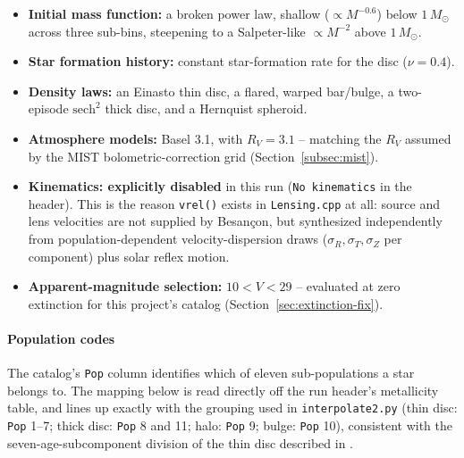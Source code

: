 \documentclass[english,10pt,a4paper]{article}
\begin{document}
	\begin{itemize}
		\item \textbf{Initial mass function:} a broken power law, shallow ($\propto M^{-0.6}$) below $1\,M_\odot$ across three sub-bins, steepening to a Salpeter-like $\propto M^{-2}$ above $1\,M_\odot$.
		\item \textbf{Star formation history:} constant star-formation rate for the disc ($\nu=0.4$).
		\item \textbf{Density laws:} an Einasto thin disc, a flared, warped bar/bulge, a two-episode $\mathrm{sech}^2$ thick disc, and a Hernquist spheroid.
		\item \textbf{Atmosphere models:} Basel 3.1, with $R_V=3.1$ -- matching the $R_V$ assumed by the MIST bolometric-correction grid (Section~\ref{subsec:mist}).
		\item \textbf{Kinematics: explicitly disabled} in this run (\texttt{No kinematics} in the header). This is the reason \texttt{vrel()} exists in \texttt{Lensing.cpp} at all: source and lens velocities are not supplied by Besan\c{c}on, but synthesized independently from population-dependent velocity-dispersion draws ($\sigma_R,\sigma_T,\sigma_Z$ per component) plus solar reflex motion.
		\item \textbf{Apparent-magnitude selection:} $10<V<29$ -- evaluated at zero extinction for this project's catalog (Section~\ref{sec:extinction-fix}).
	\end{itemize}
	
	\paragraph{Population codes}
	
	The catalog's \texttt{Pop} column identifies which of eleven sub-populations a star belongs to. The mapping below is read directly off the run header's metallicity table, and lines up exactly with the grouping used in \texttt{interpolate2.py} (thin disc: \texttt{Pop} 1--7; thick disc: \texttt{Pop} 8 and 11; halo: \texttt{Pop} 9; bulge: \texttt{Pop} 10), consistent with the seven-age-subcomponent division of the thin disc described in \cite{Robin2003Besancon}.
	
\end{document}
